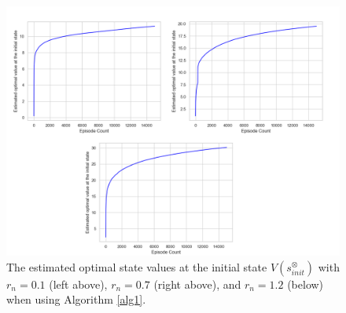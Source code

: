 \begin{figure}[H]
   \centering
   \vspace{2mm}
   \includegraphics[width = 12cm]{max_Q_value_15000_5000_rn_all_rsink_1000.png}
   \caption{The estimated optimal state values at the initial state $V(s^{\otimes}_{init})$ with $r_{n} = 0.1$ (left above), $r_n = 0.7$ (right above), and $r_n = 1.2$ (below) when using Algorithm \ref{alg1}.}
   \label{result1}
\end{figure}

